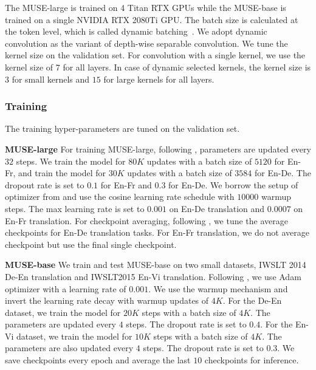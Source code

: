 \documentclass{article} %
\begin{document}

The MUSE-large is trained on 4 Titan RTX GPUs while the MUSE-base is trained on a single NVIDIA RTX 2080Ti GPU. The batch size  is calculated at the token level, which is called dynamic batching~\citep{vaswani2017attention}. 
We adopt dynamic convolution as the variant of depth-wise separable convolution. We tune the kernel size on the validation set. For convolution with a single kernel, we use the kernel size of $7$ for all layers. In case of dynamic selected kernels, the kernel size is $3$ for small kernels and $15$ for large kernels for all layers. 


\subsubsection{Training}
The training hyper-parameters are tuned on the validation set. 

\textbf{MUSE-large}
For training MUSE-large, following \citet{ott2018scaling}, parameters are updated every $32$ steps. We train the model for $80K$ updates with a batch size of $5120$ for En-Fr, and train the model for ${30K}$ updates with a batch size of ${3584}$ for En-De. The dropout rate is set to $0.1$ for En-Fr and ${0.3}$ for En-De. We borrow the  setup of optimizer from \citet{wu2019pay} and use the cosine learning rate schedule with ${10000}$ warmup steps. The max learning rate is set to $0.001$ on  En-De translation and ${0.0007}$ on En-Fr translation. For checkpoint averaging, following \citet{wu2019pay}, we tune the average checkpoints for En-De translation tasks. For En-Fr translation, we do not average checkpoint but use the final single checkpoint.


\textbf{MUSE-base}
We train and test MUSE-base on two small datasets, IWSLT 2014 De-En translation and  IWSLT2015 En-Vi translation.  Following \citet{vaswani2017attention}, we use Adam optimizer with a learning rate of $0.001$. We use the warmup mechanism and invert the learning rate decay with warmup updates of $4K$. 
For the De-En dataset, we train the model for $20K$ steps with a batch size of $4K$. The parameters are updated every $4$ steps. The dropout rate is set to $0.4$. For the En-Vi dataset, we train the model for $10K$ steps with a batch size of $4K$. The parameters are  also updated every $4$ steps. The dropout rate is set to $0.3$.
We  save checkpoints every epoch and average the last $10$ checkpoints for inference.
\end{document}
